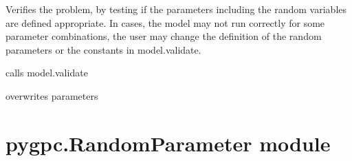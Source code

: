 \documentclass[letterpaper,10pt,english,openany,oneside]{sphinxmanual}
\begin{document}
\begin{fulllineitems}
\begin{sphinxVerbatim}[commandchars=\\\{\}]
\PYG{p}{[}\PYG{p}{]}  \PYG{p}{[} \PYG{p}{]}                           
   
\end{sphinxVerbatim}

\begin{fulllineitems}
\label{\detokenize{pygpc:pygpc.Problem.Problem.validate}}
Verifies the problem, by testing if the parameters including the random variables are defined appropriate.
In cases, the model may not run correctly for some parameter combinations, the user may change the definition
of the random parameters or the constants in model.validate.

calls model.validate

overwrites parameters

\end{fulllineitems}


\end{fulllineitems}



\section{pygpc.RandomParameter module}
\label{\detokenize{pygpc:module-pygpc.RandomParameter}}\label{\detokenize{pygpc:pygpc-randomparameter-module}}
\end{document}
